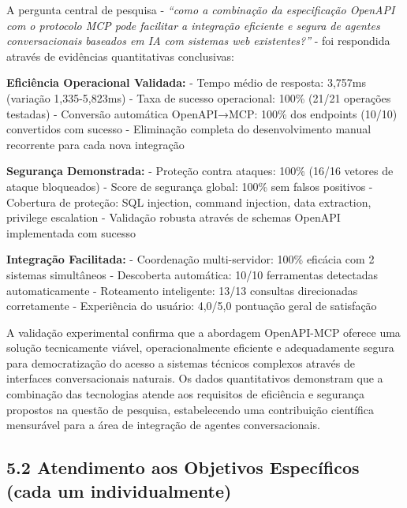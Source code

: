 \documentclass[
]{article}
\begin{document}
A pergunta central de pesquisa - \emph{``como a combinação da
especificação OpenAPI com o protocolo MCP pode facilitar a integração
eficiente e segura de agentes conversacionais baseados em IA com
sistemas web existentes?''} - foi respondida através de evidências
quantitativas conclusivas:

\textbf{Eficiência Operacional Validada:} - Tempo médio de resposta:
3,757ms (variação 1,335-5,823ms) - Taxa de sucesso operacional: 100\%
(21/21 operações testadas) - Conversão automática OpenAPI→MCP: 100\% dos
endpoints (10/10) convertidos com sucesso - Eliminação completa do
desenvolvimento manual recorrente para cada nova integração

\textbf{Segurança Demonstrada:} - Proteção contra ataques: 100\% (16/16
vetores de ataque bloqueados) - Score de segurança global: 100\% sem
falsos positivos - Cobertura de proteção: SQL injection, command
injection, data extraction, privilege escalation - Validação robusta
através de schemas OpenAPI implementada com sucesso

\textbf{Integração Facilitada:} - Coordenação multi-servidor: 100\%
eficácia com 2 sistemas simultâneos - Descoberta automática: 10/10
ferramentas detectadas automaticamente - Roteamento inteligente: 13/13
consultas direcionadas corretamente - Experiência do usuário: 4,0/5,0
pontuação geral de satisfação

A validação experimental confirma que a abordagem OpenAPI-MCP oferece
uma solução tecnicamente viável, operacionalmente eficiente e
adequadamente segura para democratização do acesso a sistemas técnicos
complexos através de interfaces conversacionais naturais. Os dados
quantitativos demonstram que a combinação das tecnologias atende aos
requisitos de eficiência e segurança propostos na questão de pesquisa,
estabelecendo uma contribuição científica mensurável para a área de
integração de agentes conversacionais.

\subsection{5.2 Atendimento aos Objetivos Específicos (cada um
individualmente)}\label{atendimento-aos-objetivos-especuxedficos-cada-um-individualmente}
\end{document}
